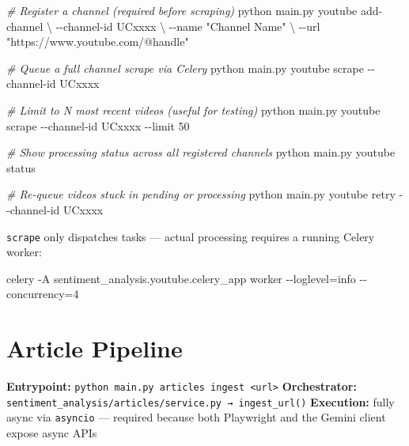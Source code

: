 \documentclass[
]{article}
\newenvironment{Shaded}{}{}
\newcommand{\AttributeTok}[1]{\textcolor[rgb]{0.49,0.56,0.16}{#1}}
\newcommand{\CommentTok}[1]{\textcolor[rgb]{0.38,0.63,0.69}{\textit{#1}}}
\newcommand{\DataTypeTok}[1]{\textcolor[rgb]{0.56,0.13,0.00}{#1}}
\newcommand{\ExtensionTok}[1]{#1}
\newcommand{\NormalTok}[1]{#1}
\newcommand{\OperatorTok}[1]{\textcolor[rgb]{0.40,0.40,0.40}{#1}}
\newcommand{\StringTok}[1]{\textcolor[rgb]{0.25,0.44,0.63}{#1}}
\begin{document}
\begin{Shaded}
\begin{Highlighting}[]
\CommentTok{\# Register a channel (required before scraping)}
\ExtensionTok{python}\NormalTok{ main.py youtube add{-}channel }\DataTypeTok{\textbackslash{}}
  \AttributeTok{{-}{-}channel{-}id}\NormalTok{ UCxxxx }\DataTypeTok{\textbackslash{}}
  \AttributeTok{{-}{-}name} \StringTok{"Channel Name"} \DataTypeTok{\textbackslash{}}
  \AttributeTok{{-}{-}url} \StringTok{"https://www.youtube.com/@handle"}

\CommentTok{\# Queue a full channel scrape via Celery}
\ExtensionTok{python}\NormalTok{ main.py youtube scrape }\AttributeTok{{-}{-}channel{-}id}\NormalTok{ UCxxxx}

\CommentTok{\# Limit to N most recent videos (useful for testing)}
\ExtensionTok{python}\NormalTok{ main.py youtube scrape }\AttributeTok{{-}{-}channel{-}id}\NormalTok{ UCxxxx }\AttributeTok{{-}{-}limit}\NormalTok{ 50}

\CommentTok{\# Show processing status across all registered channels}
\ExtensionTok{python}\NormalTok{ main.py youtube status}

\CommentTok{\# Re{-}queue videos stuck in pending or processing}
\ExtensionTok{python}\NormalTok{ main.py youtube retry }\AttributeTok{{-}{-}channel{-}id}\NormalTok{ UCxxxx}
\end{Highlighting}
\end{Shaded}

\texttt{scrape} only dispatches tasks --- actual processing requires a
running Celery worker:

\begin{Shaded}
\begin{Highlighting}[]
\ExtensionTok{celery} \AttributeTok{{-}A}\NormalTok{ sentiment\_analysis.youtube.celery\_app worker }\AttributeTok{{-}{-}loglevel}\OperatorTok{=}\NormalTok{info }\AttributeTok{{-}{-}concurrency}\OperatorTok{=}\NormalTok{4}
\end{Highlighting}
\end{Shaded}

\label{file-article-pipeline}
\section{Article Pipeline}\label{article-pipeline}

\textbf{Entrypoint:}
\texttt{python\ main.py\ articles\ ingest\ \textless{}url\textgreater{}}
\textbf{Orchestrator:}
\texttt{sentiment\_analysis/articles/service.py\ →\ ingest\_url()}
\textbf{Execution:} fully async via \texttt{asyncio} --- required
because both Playwright and the Gemini client expose async APIs
\end{document}
